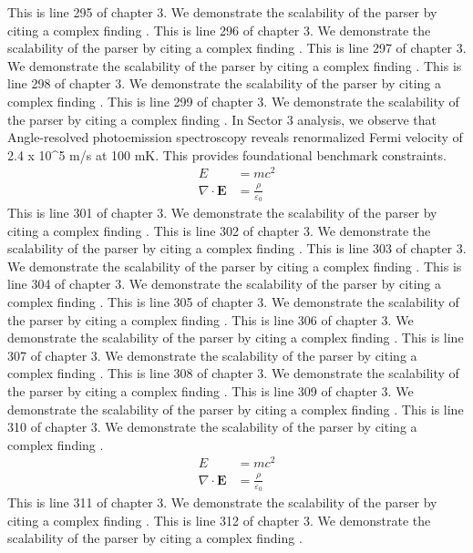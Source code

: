 This is line 295 of chapter 3. We demonstrate the scalability of the parser by citing a complex finding \cite{ref3_295}.
This is line 296 of chapter 3. We demonstrate the scalability of the parser by citing a complex finding \cite{ref3_296}.
This is line 297 of chapter 3. We demonstrate the scalability of the parser by citing a complex finding \cite{ref3_297}.
This is line 298 of chapter 3. We demonstrate the scalability of the parser by citing a complex finding \cite{ref3_298}.
This is line 299 of chapter 3. We demonstrate the scalability of the parser by citing a complex finding \cite{ref3_299}.
In Sector 3 analysis, we observe that Angle-resolved photoemission spectroscopy reveals renormalized Fermi velocity of 2.4 x 10^5 m/s at 100 mK. This provides foundational benchmark constraints.
\begin{align*}
  E &= mc^2 \\
  \nabla \cdot \mathbf{E} &= \frac{\rho}{\varepsilon_0}
\end{align*}
This is line 301 of chapter 3. We demonstrate the scalability of the parser by citing a complex finding \cite{ref3_301}.
This is line 302 of chapter 3. We demonstrate the scalability of the parser by citing a complex finding \cite{ref3_302}.
This is line 303 of chapter 3. We demonstrate the scalability of the parser by citing a complex finding \cite{ref3_303}.
This is line 304 of chapter 3. We demonstrate the scalability of the parser by citing a complex finding \cite{ref3_304}.
This is line 305 of chapter 3. We demonstrate the scalability of the parser by citing a complex finding \cite{ref3_305}.
This is line 306 of chapter 3. We demonstrate the scalability of the parser by citing a complex finding \cite{ref3_306}.
This is line 307 of chapter 3. We demonstrate the scalability of the parser by citing a complex finding \cite{ref3_307}.
This is line 308 of chapter 3. We demonstrate the scalability of the parser by citing a complex finding \cite{ref3_308}.
This is line 309 of chapter 3. We demonstrate the scalability of the parser by citing a complex finding \cite{ref3_309}.
This is line 310 of chapter 3. We demonstrate the scalability of the parser by citing a complex finding \cite{ref3_310}.
\begin{align*}
  E &= mc^2 \\
  \nabla \cdot \mathbf{E} &= \frac{\rho}{\varepsilon_0}
\end{align*}
This is line 311 of chapter 3. We demonstrate the scalability of the parser by citing a complex finding \cite{ref3_311}.
This is line 312 of chapter 3. We demonstrate the scalability of the parser by citing a complex finding \cite{ref3_312}.
